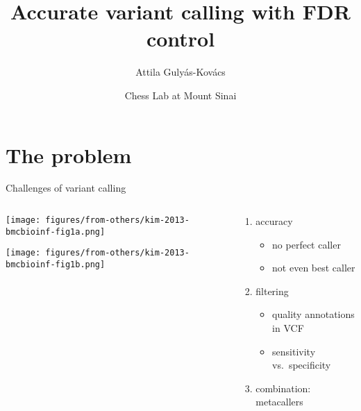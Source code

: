 \documentclass{beamer} %
\title{Accurate variant calling with FDR control}
\author{Attila Guly\'{a}s-Kov\'{a}cs}
\date{Chess Lab at Mount Sinai}
\begin{document}
\begin{frame}[plain, label=title]
\maketitle
\end{frame}

\section{The problem}

\begin{frame}{Challenges of variant calling}
\begin{columns}[t]
\begin{column}{0.4\textwidth}

\texttt{[image: figures/from-others/kim-2013-bmcbioinf-fig1a.png]}

\texttt{[image: figures/from-others/kim-2013-bmcbioinf-fig1b.png]}
\end{column}
\begin{column}{0.5\textwidth}
\begin{enumerate}
\item accuracy
\begin{itemize}
\item no perfect caller
\item not even best caller
\end{itemize}
\item filtering
\begin{itemize}
\item quality annotations in VCF
\item sensitivity vs.~specificity
\end{itemize}
\item combination: \alert{meta}callers
\end{enumerate}
\end{column}
\end{columns}
\end{frame}
\end{document}
